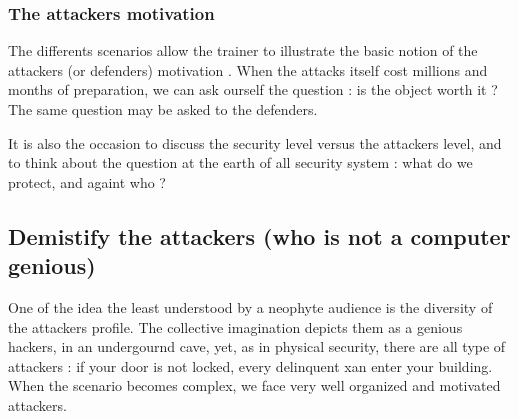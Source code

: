\documentclass[11pt]{article} %
\begin{document}
\subsubsection{The attackers motivation}
The differents scenarios allow the trainer to illustrate the basic notion of the 
attackers (or defenders) motivation . When the attacks itself cost millions and months of 
preparation, we can ask ourself the question : is the object worth it ?
The same question may be asked to the defenders.

It is also the occasion to discuss the security level versus the attackers level, and to 
think about the question at the earth of all security system : 
what do we protect, and againt who ?

\subsection{Demistify the attackers (who is not a computer genious)}
One of the idea the least understood by a neophyte audience is the diversity 
of the attackers profile. The collective imagination depicts them as a genious hackers, 
in an undergournd cave, yet, as in physical security, there are all type of attackers :
if your door is not locked, every delinquent xan enter your building. When the scenario
becomes complex, we face very well organized and motivated attackers.
\end{document}
